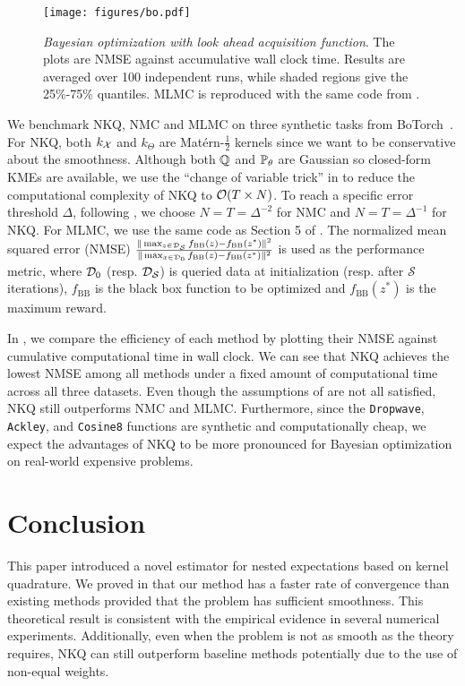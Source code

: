 \begin{figure*}[t]
\vspace{-5pt}
    \centering
    \texttt{[image: figures/bo.pdf]}
    \vspace{-20pt}
    \caption{\emph{Bayesian optimization with look ahead acquisition function}. The plots are NMSE against accumulative wall clock time.
    Results are averaged over 100 independent runs, while shaded regions give the 25\%-75\% quantiles. 
    MLMC is reproduced with the same code from \citet{Yang2024}.
    }
    \label{fig:bo}
\end{figure*}


We benchmark NKQ, NMC and MLMC on three synthetic tasks from BoTorch~\citep{balandat2020botorch}. 
For NKQ, both $k_{\mathcal{X}}$ and $k_\Theta$ are Mat\'ern-$\frac{1}{2}$ kernels since we want to be conservative about the smoothness. 
Although both $\mathbb{Q}$ and $\mathbb{P}_\theta$ are Gaussian so closed-form KMEs are available, we use the ``change of variable trick'' in  to reduce the computational complexity of NKQ to $\mathcal{O}(T \times N)$.
To reach a specific error threshold $\Delta$, following , we choose $N=T=\Delta^{-2}$ for NMC and $N=T=\Delta^{-1}$ for NKQ. 
For MLMC, we use the same code as Section 5 of \citet{Yang2024}.
The normalized mean squared error (NMSE) $\frac{\|\max _{z \in \mathcal{D}_{\mathcal{S}} } f_{\text{BB}}(z)-f_{\text{BB}}(z^*)\|^2}{\|\max_{x \in \mathcal{D}_0} f_{\text{BB}}(z) - f_{\text{BB}}(z^*)\|^2}$ is used as the performance metric, where $\mathcal{D}_0$ (resp. $\mathcal{D}_{\mathcal{S}}$) is queried data at initialization (resp. after $\mathcal{S}$ iterations),  $f_{\text{BB}}$ is the black box function to be optimized and $f_{\text{BB}}(z^*)$ is the maximum reward. 

In , we compare the efficiency of each method by plotting their NMSE against cumulative computational time in wall clock. We can see that NKQ achieves the lowest NMSE among all methods under a fixed amount of computational time across all three datasets. 
Even though the assumptions of  are not all satisfied, NKQ still outperforms NMC and MLMC.
Furthermore, since the \texttt{Dropwave}, \texttt{Ackley}, and \texttt{Cosine8} functions are synthetic and computationally cheap, we expect the advantages of NKQ to be more pronounced for Bayesian optimization on real-world expensive problems.

\vspace{-1mm}
\section{Conclusion}
This paper introduced a novel estimator for nested expectations based on kernel quadrature. 
We proved in  that our method has a faster rate of convergence than existing methods provided that the problem has sufficient smoothness. 
This theoretical result is consistent with the empirical evidence in several numerical experiments. 
Additionally, even when the problem is not as smooth as the theory requires, NKQ can still outperform baseline methods potentially due to the use of non-equal weights.

